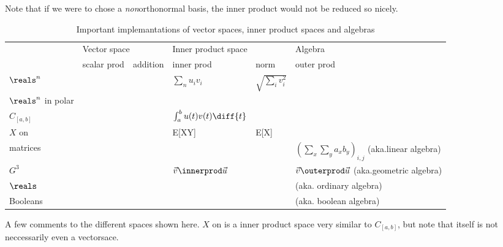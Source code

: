 Note that if we were to chose a \emph{non}orthonormal basis, the inner product would not be reduced so nicely.



\begin{table}[ht]
\centering
\caption{Important implemantations of vector spaces, inner product spaces and algebras}
\begin{tabular}{@{}llllll@{}}
\toprule
                    & \multicolumn{2}{l}{Vector space} & \multicolumn{2}{l}{Inner product space}            & Algebra                                                  \\ 
                    & scalar prod      & addition      & inner prod                     & norm                   & outer prod                                               \\ 
\midrule
$\reals^n$          &                  &               & $\sum_n u_i v_i$               & $\sqrt{\sum_i v_i^2}$  &                                                          \\
$\reals^n$ in polar &                  &               &                                &                        &                                                          \\
$C_{[a,b]}$         &                  &               & $\int_a^b u(t) v(t) \diff{t} $ &                        &                                                          \\
$X$ on \samplespace &                  &               & E[XY]                          & E[X]                   &                                                          \\
matrices            &                  &               &                                &                        & $(\sum_x \sum_y a_x b_y)_{i,j}$ (aka.linear algebra)     \\
$G^3$               &                  &               &$\vec{v} \innerprod \vec{u}$    &                        & $\vec{v} \outerprod \vec{u}$ (aka.geometric algebra)     \\
$\reals$            &                  &               &                                &                        & (aka. ordinary algebra)                                  \\
Booleans            &                  &               &                                &                        & (aka. boolean algebra)                                   \\
\bottomrule
\end{tabular}

\vspace{1ex}
\raggedright \begin{footnotesize} A few comments to the different spaces shown here. $X$ on \samplespace is a inner product space very similar to $C_{[a,b]}$, but note that \samplespace itself is not neccessarily even a vectorsace. \end{footnotesize}

\end{table}

